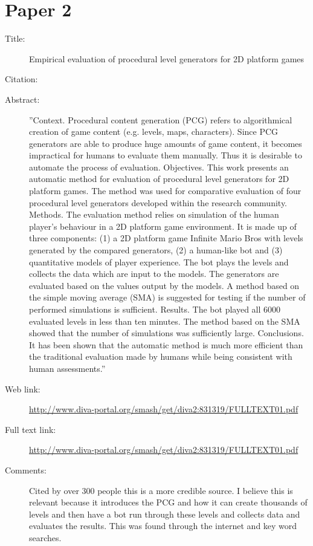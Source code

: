 \documentclass{scrartcl}
\begin{document}
	\section*{Paper 2}
	\begin{description}
		\item[Title:] Empirical evaluation of procedural level
		generators for 2D platform games
		\item[Citation:] \cite{empirical}
		\item[Abstract:] ''Context. Procedural content generation (PCG) refers to algorithmical creation of game content (e.g.
		levels, maps, characters). Since PCG generators are able to produce huge amounts of game content, it
		becomes impractical for humans to evaluate them manually. Thus it is desirable to automate the
		process of evaluation.
		Objectives. This work presents an automatic method for evaluation of procedural level generators for
		2D platform games. The method was used for comparative evaluation of four procedural level
		generators developed within the research community.
		Methods. The evaluation method relies on simulation of the human player's behaviour in a 2D
		platform game environment. It is made up of three components: (1) a 2D platform game Infinite Mario
		Bros with levels generated by the compared generators, (2) a human-like bot and (3) quantitative
		models of player experience. The bot plays the levels and collects the data which are input to the
		models. The generators are evaluated based on the values output by the models. A method based on
		the simple moving average (SMA) is suggested for testing if the number of performed simulations is
		sufficient.
		Results. The bot played all 6000 evaluated levels in less than ten minutes. The method based on the
		SMA showed that the number of simulations was sufficiently large.
		Conclusions. It has been shown that the automatic method is much more efficient than the traditional
		evaluation made by humans while being consistent with human assessments.''
		\item[Web link:] \url {http://www.diva-portal.org/smash/get/diva2:831319/FULLTEXT01.pdf}
		\item[Full text link:] \url {http://www.diva-portal.org/smash/get/diva2:831319/FULLTEXT01.pdf}
		\item[Comments:] Cited by over 300 people this is a more credible source. I believe this is relevant because it introduces the PCG and how it can create thousands of levels and then have a bot run through these levels and collects data and evaluates the results. This was found through the internet and key word searches.
	\end{description}
	
\end{document}

